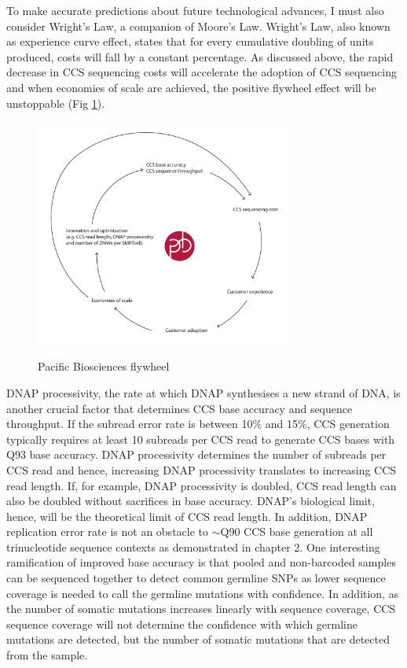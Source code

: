 To make accurate predictions about future technological advances, I must also consider Wright’s Law, a companion of Moore’s Law. Wright’s Law, also known as experience curve effect, states that for every cumulative doubling of units produced, costs will fall by a constant percentage. As discussed above, the rapid decrease in CCS sequencing costs will accelerate the adoption of CCS sequencing and when economies of scale are achieved, the positive flywheel effect will be unstoppable (Fig \ref{figure:flywheel}). 

\begin{figure}[h!]
\caption{Pacific Biosciences flywheel}
\label{figure:flywheel}
\begin{centering}
\includegraphics[width=0.75\textwidth]{pacbio_flywheel.pdf} \\ \smallskip
\end{centering}
\end{figure}


DNAP processivity, the rate at which DNAP synthesises a new strand of DNA, is another crucial factor that determines CCS base accuracy and sequence throughput. If the subread error rate is between 10\% and 15\%, CCS generation typically requires at least 10 subreads per CCS read to generate CCS bases with Q93 base accuracy. DNAP processivity determines the number of subreads per CCS read and hence, increasing DNAP processivity translates to increasing CCS read length. If, for example, DNAP processivity is doubled, CCS read length can also be doubled without sacrifices in base accuracy. DNAP’s biological limit, hence, will be the theoretical limit of CCS read length. In addition, DNAP replication error rate is not an obstacle to $\sim$Q90 CCS base generation at all trinucleotide sequence contexts as demonstrated in chapter 2. One interesting ramification of improved base accuracy is that pooled and non-barcoded samples can be sequenced together to detect common germline SNPs as lower sequence coverage is needed to call the germline mutations with confidence. In addition, as the number of somatic mutations increases linearly with sequence coverage, CCS sequence coverage will not determine the confidence with which germline mutations are detected, but the number of somatic mutations that are detected from the sample. 

